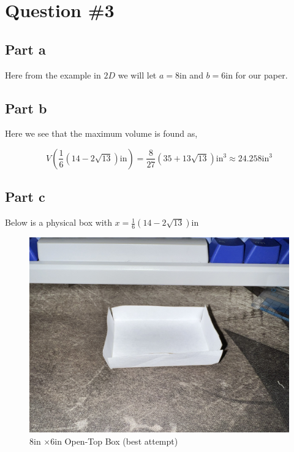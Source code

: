 \documentclass{article}
\begin{document}
\section*{Question \#3}

\subsection*{Part a}
Here from the example in $2D$ we will let $a = 8$in and $b = 6$in for our paper.

\subsection*{Part b}
Here we see that the maximum volume is found as,

\begin{equation*}
    V\left(\frac{1}{6}(14-2\sqrt{13})\text{in}\right) = \frac{8}{27}(35 + 13\sqrt{13})\text{in}^3 \approx 24.258\text{in}^3
\end{equation*}

\subsection*{Part c}
Below is a physical box with $x = \frac{1}{6}(14-2\sqrt{13})\text{in}$
\begin{figure}[H]
    \centering
    \includegraphics[scale=0.1]{IMG_2255.jpg}
    \caption{$8$in $\times 6$in Open-Top Box (best attempt)}
    \label{fig:my_label}
\end{figure}
\end{document}
